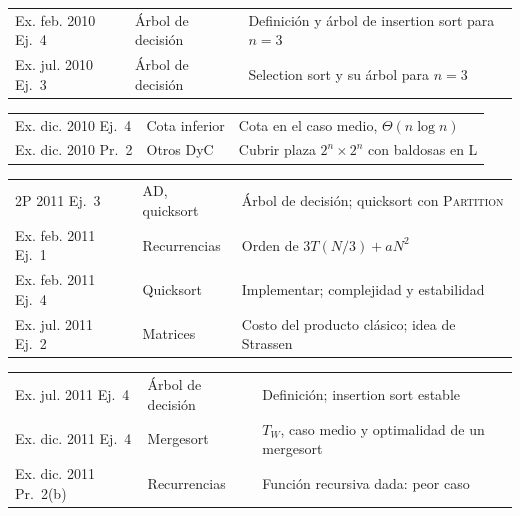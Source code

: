 {\begin{tabularx}{\textwidth}{@{}>{\raggedright\arraybackslash}p{2.95cm}>{\raggedright\arraybackslash}p{2.75cm}>{\raggedright\arraybackslash}X@{}}
Ex. feb. 2010 Ej.~4 & Árbol de decisión & Definición y árbol de insertion sort para $n=3$ \\
Ex. jul. 2010 Ej.~3 & Árbol de decisión & Selection sort y su árbol para $n=3$ \\
\end{tabularx}\par\vspace{-\parskip}
\begin{tabularx}{\textwidth}{@{}>{\raggedright\arraybackslash}p{2.95cm}>{\raggedright\arraybackslash}p{2.75cm}>{\raggedright\arraybackslash}X@{}}
Ex. dic. 2010 Ej.~4 & Cota inferior & Cota en el caso medio, $\Theta(n\log n)$ \\
Ex. dic. 2010 Pr.~2 & Otros DyC & Cubrir plaza $2^n\times2^n$ con baldosas en L \\
\end{tabularx}\par\vspace{-\parskip}
\begin{tabularx}{\textwidth}{@{}>{\raggedright\arraybackslash}p{2.95cm}>{\raggedright\arraybackslash}p{2.75cm}>{\raggedright\arraybackslash}X@{}}
2P 2011 Ej.~3 & AD, quicksort & Árbol de decisión; quicksort con \textsc{Partition} \\
Ex. feb. 2011 Ej.~1 & Recurrencias & Orden de $3T(N/3)+aN^2$ \\
Ex. feb. 2011 Ej.~4 & Quicksort & Implementar; complejidad y estabilidad \\
Ex. jul. 2011 Ej.~2 & Matrices & Costo del producto clásico; idea de Strassen \\
\end{tabularx}\par\vspace{-\parskip}
\begin{tabularx}{\textwidth}{@{}>{\raggedright\arraybackslash}p{2.95cm}>{\raggedright\arraybackslash}p{2.75cm}>{\raggedright\arraybackslash}X@{}}
Ex. jul. 2011 Ej.~4 & Árbol de decisión & Definición; insertion sort estable \\
Ex. dic. 2011 Ej.~4 & Mergesort & $T_W$, caso medio y optimalidad de un mergesort \\
Ex. dic. 2011 Pr.~2(b) & Recurrencias & Función recursiva dada: peor caso \\
\end{tabularx}\par\vspace{-\parskip}
\begin{tabularx}{\textwidth}{@{}>{\raggedright\arraybackslash}p{2.95cm}>{\raggedright\arraybackslash}p{2.75cm}>{\raggedright\arraybackslash}X@{}}

\end{tabularx}}
